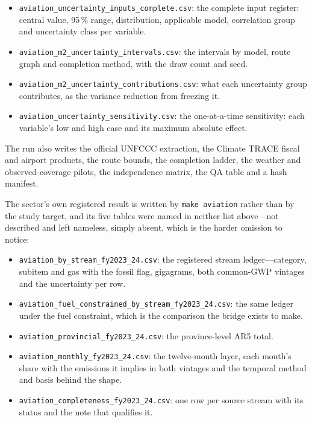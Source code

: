 \begin{itemize}
\item \texttt{aviation\_uncertainty\_inputs\_complete.csv}: the complete input register: central value, 95\,\% range, distribution, applicable model, correlation group and uncertainty class per variable.
\item \texttt{aviation\_m2\_uncertainty\_intervals.csv}: the intervals by model, route graph and completion method, with the draw count and seed.
\item \texttt{aviation\_\allowbreak m2\_\allowbreak uncertainty\_\allowbreak contributions.csv}: what each uncertainty group contributes, as the variance reduction from freezing it.
\item \texttt{aviation\_uncertainty\_sensitivity.csv}: the one-at-a-time sensitivity: each variable's low and high case and its maximum absolute effect.
\end{itemize}

The run also writes the official UNFCCC extraction, the Climate TRACE fiscal and airport
products, the route bounds, the completion ladder, the weather and observed-coverage pilots,
the independence matrix, the QA table and a hash manifest.

The sector's own registered result is written by \texttt{make aviation} rather than by the
study target, and its five tables were named in neither list above---not described and left
nameless, simply absent, which is the harder omission to notice:

\begin{itemize}\itemsep2pt
\item \texttt{aviation\_\allowbreak by\_\allowbreak stream\_\allowbreak fy2023\_\allowbreak 24.csv}: the registered stream ledger---category,
  subitem and gas with the fossil flag, gigagrams, both common-GWP vintages and the
  uncertainty per row.
\item \texttt{aviation\_\allowbreak fuel\_\allowbreak constrained\_\allowbreak by\_\allowbreak stream\_\allowbreak fy2023\_\allowbreak 24.csv}: the same ledger
  under the fuel constraint, which is the comparison the bridge exists to make.
\item \texttt{aviation\_provincial\_fy2023\_24.csv}: the province-level AR5 total.
\item \texttt{aviation\_monthly\_fy2023\_24.csv}: the twelve-month layer, each month's share
  with the emissions it implies in both vintages and the temporal method and basis behind the
  shape.
\item \texttt{aviation\_completeness\_fy2023\_24.csv}: one row per source stream with its
  status and the note that qualifies it.
\end{itemize}

